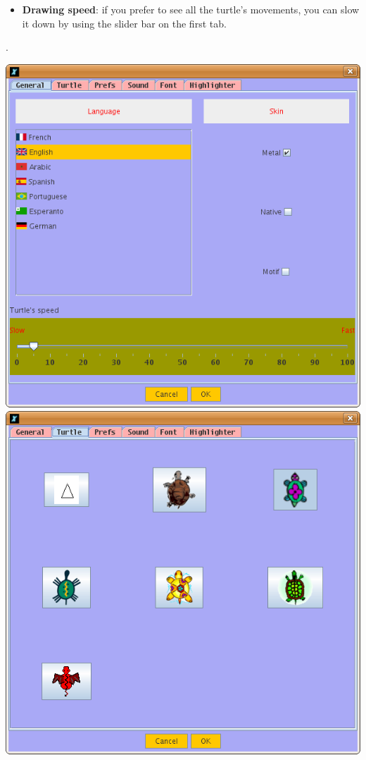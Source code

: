 \begin{itemize}
\begin{itemize}
\begin{itemize}
	\item \textbf{Drawing speed}: if you prefer to see all the turtle's movements, you can slow it down by using the slider bar on the first tab.
	\end{itemize}. 
	\begin{center}
 		\includegraphics[scale=0.3]{pics/interface-CapturePref1.png}
 		\includegraphics[scale=0.3]{pics/interface-CapturePref2.png}

\end{center}
\end{itemize}
\end{itemize}
